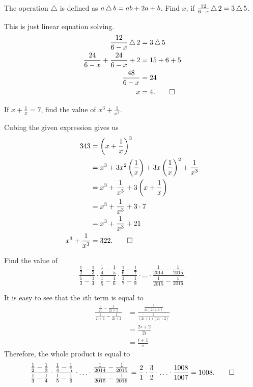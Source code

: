 \begin{question}
    The operation $\triangle$ is defined as $a \operatorname{\triangle} b = ab + 2a + b$.
    Find $x$, if $\frac{12}{6 - x} \operatorname{\triangle} 2 = 3 \operatorname{\triangle} 5$.
\end{question}
\begin{solution}
    This is just linear equation solving.
    \begin{align*}
        \frac{12}{6 - x} \operatorname{\triangle} 2 &= 3 \operatorname{\triangle} 5\\
        \frac{24}{6 - x} + \frac{24}{6 - x} + 2 &= 15 + 6 + 5 \\
        \frac{48}{6 - x} &= 24\\
        x &= 4. \qedhere
    \end{align*}
\end{solution}

\begin{question}
    If $x + \frac{1}{x} = 7$, find the value of $x^3 + \frac{1}{x^3}$.
\end{question}
\begin{solution}
    Cubing the given expression gives us
    \begin{align*}
        343 &= \left( x + \frac{1}{x} \right)^3\\
        &= x^3 + 3 x^2 \left( \frac{1}{x} \right) + 3 x \left( \frac{1}{x} \right)^2 + \frac{1}{x^3}\\
        &= x^3 + \frac{1}{x^3} + 3 \left( x + \frac{1}{x} \right)\\
        &= x^3 + \frac{1}{x^3} + 3 \cdot 7\\
        &= x^3 + \frac{1}{x^3} + 21\\
        x^3 + \frac{1}{x^3} &= 322. \qedhere
    \end{align*}
\end{solution}

\begin{question}
    Find the value of 
    \[\frac{\frac{1}{2} - \frac{1}{3}}{\frac{1}{3} - \frac{1}{4}} 
    \cdot \frac{\frac{1}{4} - \frac{1}{5}}{\frac{1}{5} - \frac{1}{6}}
    \cdot \frac{\frac{1}{6} - \frac{1}{7}}{\frac{1}{7} - \frac{1}{8}}
    \cdot \ldots \cdot \frac{\frac{1}{2014} - \frac{1}{2015}}{\frac{1}{2015} - \frac{1}{2016}}.\]
\end{question}
\begin{solution}
    It is easy to see that the $i$th term is equal to 
    \begin{align*}
        \frac{\frac{1}{2i} - \frac{1}{2i + 1}}{\frac{1}{2i + 1} - \frac{1}{2i + 2}} &= \frac{\frac{1}{2i(2i + 1)}}{\frac{1}{(2i + 1)(2i + 2)}} \\
        &= \frac{2i + 2}{2i} \\
        &= \frac{i + 1}{i}
    \end{align*}
    Therefore, the whole product is equal to
    \[ \frac{\frac{1}{2} - \frac{1}{3}}{\frac{1}{3} - \frac{1}{4}} 
    \cdot \frac{\frac{1}{4} - \frac{1}{5}}{\frac{1}{5} - \frac{1}{6}}
    \cdot \ldots \cdot \frac{\frac{1}{2014} - \frac{1}{2015}}{\frac{1}{2015} - \frac{1}{2016}} = \frac{2}{1}\cdot\frac{3}{2}\cdot \ldots \cdot \frac{1008}{1007} = 1008. \qedhere\]
\end{solution}

